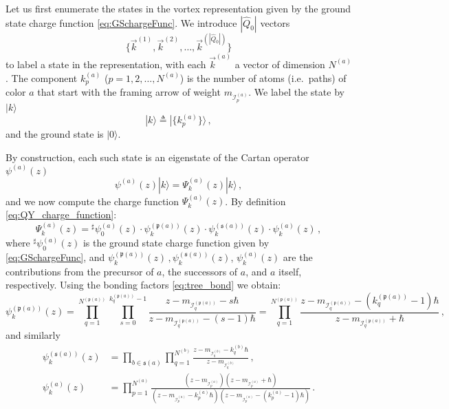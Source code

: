 \documentclass[12pt,a4paper]{article}
\renewcommand{\(}{\left(}
\renewcommand{\)}{\right)}
\renewcommand{\(}{\left(}
\renewcommand{\)}{\right)}
\begin{document}
Let us first enumerate the states in the vortex representation given by the ground state charge function \eqref{eq:GSchargeFunc}.    
We introduce $|\widehat{Q}_0|$ vectors 
\begin{equation}
\{\vec{k}^{(1)},\vec{k}^{(2)},\dots,\vec{k}^{(|\widehat{Q}_0|)}\}    
\end{equation}
to label a state in the representation, with each $\vec{k}^{(a)}$ a vector of dimension $N^{(a)}$. 
The component $k^{(a)}_{p}$ ($p=1,2,\dots,N^{(a)}$) is the number of atoms (i.e.\ paths) of color $a$ that start with the framing arrow of weight $m_{\mathcal{I}^{(a)}_{p}}$. 
We label the state by $|k\rangle$
\begin{equation}
|k\rangle\triangleq |\{k^{(a)}_{p}\}\rangle\,,
\end{equation}
and the ground state is $|0\rangle$. 

By construction, each such state is an eigenstate of the Cartan operator $\psi^{(a)}(z)$
\begin{equation}\label{eq:psi-action}
\psi^{(a)}(z)|k\rangle=\Psi^{(a)}_k(z)|k\rangle\,,
\end{equation}
and we now compute the charge function $\Psi^{(a)}_k(z)$. By definition \eqref{eq:QY_charge_function}: 
\begin{equation}
    \Psi^{(a)}_k(z)={}^{\sharp}\psi^{(a)}_0(z)\cdot \psi^{(\mathfrak{p}(a))}_k(z)\cdot \psi^{(\mathfrak{s}(a))}_k(z)\cdot \psi^{(a)}_k(z)\,,
\end{equation}
where ${}^{\sharp}\psi^{(a)}_0(z)$ is the ground state charge function given by \eqref{eq:GSchargeFunc}, and $\psi^{(\mathfrak{p}(a))}_k(z)\,, \psi^{(\mathfrak{s}(a))}_k(z)$, $\psi^{(a)}_k(z)$ are the contributions from the precursor of $a$, the successors of $a$, and $a$ itself, respectively. Using the bonding factors \eqref{eq:tree_bond} we obtain:
{\small
\begin{equation}
\psi^{(\mathfrak{p}(a))}_k(z)=\prod_{q=1}^{N^{(\mathfrak{p}(a))}}\prod_{s=0}^{k^{(\mathfrak{p}(a))}_q-1}\frac{z-m_{\mathcal{I}^{(\mathfrak{p}(a))}_q}-s\hbar}{z-m_{\mathcal{I}^{(\mathfrak{p}(a))}_q}-(s-1)\hbar}=\prod_{q=1}^{N^{(\mathfrak{p}(a))}}\frac{z-m_{\mathcal{I}^{(\mathfrak{p}(a))}_q}-(k^{(\mathfrak{p}(a))}_q-1)\hbar}{z-m_{\mathcal{I}^{(\mathfrak{p}(a))}_q}+\hbar}\,,
\end{equation}
}
and similarly
{\small
\begin{align}
\psi^{(\mathfrak{s}(a))}_k(z)&=\prod_{b\in\mathfrak{s}(a)}\prod_{q=1}^{N^{(b)}}\frac{z-m_{\mathcal{I}^{(b)}_q}-k^{(b)}_q\hbar}{z-m_{\mathcal{I}^{(b)}_q}}\,,\\ \psi^{(a)}_k(z)&=\prod_{p=1}^{N^{(a)}}\frac{(z-m_{\mathcal{I}^{(a)}_p})(z-m_{\mathcal{I}^{(a)}_p}+\hbar)}{(z-m_{\mathcal{I}^{(a)}_p}-k^{(a)}_p\hbar)(z-m_{\mathcal{I}^{(a)}_p}-(k^{(a)}_p-1)\hbar)}\,.
\end{align}}
\end{document}
